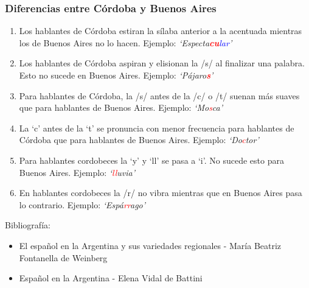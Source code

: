 \documentclass[mathserif]{beamer}%
\begin{document}
\begin{frame}
	\frametitle{Diferencias entre Córdoba y Buenos Aires}
		
	\begin{enumerate}[(1)]\itemsep=1ex
		\item Los hablantes de Córdoba estiran la sílaba anterior a la acentuada mientras los de Buenos Aires no lo hacen. Ejemplo: \textit{`Especta\textcolor{red}{\textbf{\textit{cu}}}\textcolor{blue}{lar}'} \\ 
		
		\item Los hablantes de Córdoba aspiran y elisionan la /s/ al finalizar una palabra. Esto no sucede en Buenos Aires. Ejemplo: \textit{`Pájaro\textcolor{red}{\textbf{\textit{s}}}'}\\ 
		
		\item Para hablantes de Córdoba, la /s/ antes de la /c/ o /t/ suenan más suaves que para hablantes de Buenos Aires. Ejemplo: \textit{`Mo\textcolor{red}{s}ca'} \\ 
		
		\item La `c' antes de la `t' se pronuncia con menor frecuencia para hablantes de Córdoba que para hablantes de Buenos Aires. Ejemplo: \textit{`Do\textcolor{red}{c}tor'} \\ 
		
		\item Para hablantes cordobeces la `y’ y `ll’ se pasa a `i’. No sucede esto para Buenos Aires. Ejemplo: \textit{`\textcolor{red}{ll}uvia'} \\
		
		\item En hablantes cordobeces la /r/ no vibra mientras que en Buenos Aires pasa lo contrario. Ejemplo: \textit{`Espá\textcolor{red}{rr}ago'} \\ 
	\end{enumerate}	
	
	{\tiny Bibliografía:
		\begin{itemize}
			\item El español en la Argentina y sus variedades regionales - María Beatriz Fontanella de Weinberg
			\item Español en la Argentina - Elena Vidal de Battini
		\end{itemize}}	

\end{frame}

\end{document}
